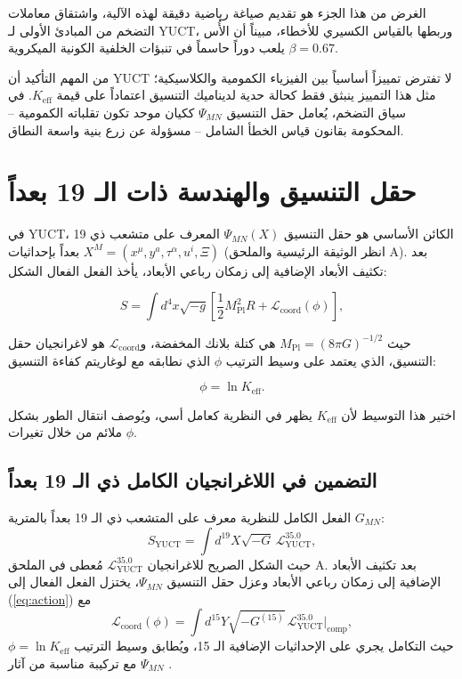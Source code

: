 \documentclass[12pt,a4paper]{article}
\newcommand{\Keff}{K_{\mathrm{eff}}}
\newcommand{\Mpl}{M_{\mathrm{Pl}}}
\begin{document}
	الغرض من هذا الجزء هو تقديم صياغة رياضية دقيقة لهذه الآلية، واشتقاق معاملات التضخم من المبادئ الأولى لـ YUCT، وربطها بالقياس الكسيري للأخطاء، مبيناً أن الأُس \(\beta = 0.67\) يلعب دوراً حاسماً في تنبؤات الخلفية الكونية الميكروية.
	
	من المهم التأكيد أن YUCT لا تفترض تمييزاً أساسياً بين الفيزياء الكمومية والكلاسيكية؛ مثل هذا التمييز ينبثق فقط كحالة حدية لديناميك التنسيق اعتماداً على قيمة \(K_{\mathrm{eff}}\). في سياق التضخم، يُعامل حقل التنسيق \(\Psi_{MN}\) ككيان موحد تكون تقلباته الكمومية – المحكومة بقانون قياس الخطأ الشامل – مسؤولة عن زرع بنية واسعة النطاق.
	
	\section{حقل التنسيق والهندسة ذات الـ 19 بعداً}
	\label{sec:field}
	
	في YUCT، الكائن الأساسي هو حقل التنسيق \(\Psi_{MN}(X)\) المعرف على متشعب ذي 19 بعداً بإحداثيات \(X^M = (x^\mu, y^a, \tau^\alpha, u^i, \Xi)\) (انظر الوثيقة الرئيسية والملحق A). بعد تكثيف الأبعاد الإضافية إلى زمكان رباعي الأبعاد، يأخذ الفعل الفعال الشكل:
	
	\begin{equation}
		S = \int d^4x \sqrt{-g} \left[ \frac{1}{2} \Mpl^2 R + \mathcal{L}_{\mathrm{coord}}(\phi) \right],
		\label{eq:action}
	\end{equation}
	
	حيث \(\Mpl = (8\pi G)^{-1/2}\) هي كتلة بلانك المخفضة، و\(\mathcal{L}_{\mathrm{coord}}\) هو لاغرانجيان حقل التنسيق، الذي يعتمد على وسيط الترتيب \(\phi\) الذي نطابقه مع لوغاريتم كفاءة التنسيق:
	
	\begin{equation}
		\phi = \ln \Keff.
		\label{eq:phi-def}
	\end{equation}
	
	اختير هذا التوسيط لأن \(\Keff\) يظهر في النظرية كعامل أسي، ويُوصف انتقال الطور بشكل ملائم من خلال تغيرات \(\phi\).
	
	\subsection{التضمين في اللاغرانجيان الكامل ذي الـ 19 بعداً}
	
	الفعل الكامل للنظرية معرف على المتشعب ذي الـ 19 بعداً بالمترية \(G_{MN}\):
	\begin{equation}
		S_{\text{YUCT}} = \int d^{19}X \sqrt{-G} \, \mathcal{L}_{\text{YUCT}}^{35.0},
		\label{eq:full-action}
	\end{equation}
	حيث الشكل الصريح للاغرانجيان \(\mathcal{L}_{\text{YUCT}}^{35.0}\) مُعطى في الملحق A. بعد تكثيف الأبعاد الإضافية إلى زمكان رباعي الأبعاد وعزل حقل التنسيق \(\Psi_{MN}\)، يختزل الفعل الفعال إلى (\ref{eq:action}) مع
	\begin{equation}
		\mathcal{L}_{\mathrm{coord}}(\phi) = \int d^{15}Y \sqrt{-G^{(15)}} \, \mathcal{L}_{\text{YUCT}}^{35.0}\big|_{\text{comp}},
	\end{equation}
	حيث التكامل يجري على الإحداثيات الإضافية الـ 15، ويُطابق وسيط الترتيب \(\phi = \ln\Keff\) مع تركيبة مناسبة من آثار \(\Psi_{MN}\) \cite{Yakushev2026}.
	
\end{document}

